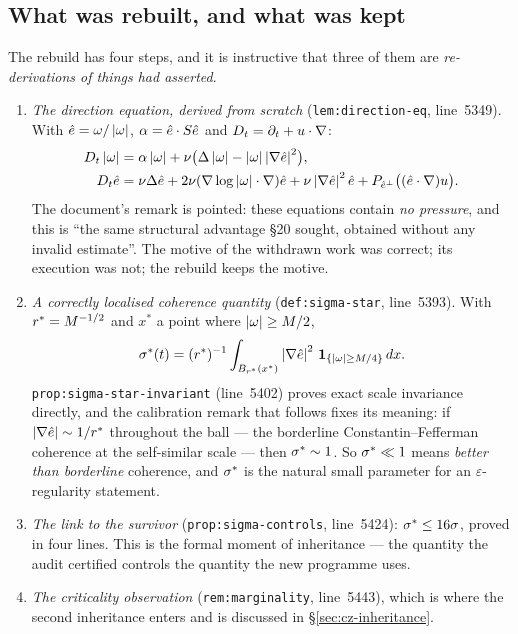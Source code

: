 \subsection{What was rebuilt, and what was kept}

The rebuild has four steps, and it is instructive that three of them are
\emph{re-derivations of things  had asserted}.

\begin{enumerate}[leftmargin=2.2em]
\item \emph{The direction equation, derived from scratch}
  (\texttt{lem:direction-eq}, line~5349). With \(\hat{e}=\omega/\left|\omega\right|\),
  \(\alpha=\hat{e}\cdot S\hat{e}\) and \(D_t=\partial_t+u\cdot\nabla\):
  \begin{align*}
    D_t\left|\omega\right| &= \alpha\left|\omega\right|
      + \nu\bigl(\Delta\left|\omega\right|-\left|\omega\right|\left|\nabla\hat{e}\right|^2\bigr),\\
    D_t\hat{e} &= \nu\Delta\hat{e}
      + 2\nu(\nabla\log\left|\omega\right|\cdot\nabla)\hat{e}
      + \nu\left|\nabla\hat{e}\right|^2\hat{e}
      + P_{\hat{e}^\perp}\bigl((\hat{e}\cdot\nabla)u\bigr).
  \end{align*}
  The document's remark is pointed: these equations contain \emph{no
  pressure}, and this is ``the same structural advantage \S20 sought, obtained
  without any invalid estimate''. The motive of the withdrawn work was
  correct; its execution was not; the rebuild keeps the motive.
\item \emph{A correctly localised coherence quantity}
  (\texttt{def:sigma-star}, line~5393). With \(r^{*}=M^{-1/2}\) and \(x^*\) a
  point where \(\left|\omega\right|\ge M/2\),
  \[
    \sigma^{*}(t) = (r^{*})^{-1}\int_{B_{r^{*}}(x^*)}
      \left|\nabla\hat{e}\right|^2\,\mathbf 1_{\{\left|\omega\right|\ge M/4\}}\,dx .
  \]
  \texttt{prop:sigma-star-invariant} (line~5402) proves exact scale
  invariance directly, and the calibration remark that follows fixes its
  meaning: if \(\left|\nabla\hat{e}\right|\sim1/r^{*}\) throughout the ball --- the
  borderline Constantin--Fefferman coherence at the self-similar scale --- then
  \(\sigma^{*}\sim1\). So \(\sigma^{*}\ll1\) means \emph{better than borderline}
  coherence, and \(\sigma^{*}\) is the natural small parameter for an
  \(\varepsilon\)-regularity statement.
\item \emph{The link to the survivor} (\texttt{prop:sigma-controls},
  line~5424): \(\sigma^{*}\le16\sigma\), proved in four lines. This is the formal
  moment of inheritance --- the quantity the audit certified controls the
  quantity the new programme uses.
\item \emph{The criticality observation} (\texttt{rem:marginality},
  line~5443), which is where the second inheritance enters and is discussed in
  \S\ref{sec:cz-inheritance}.
\end{enumerate}


